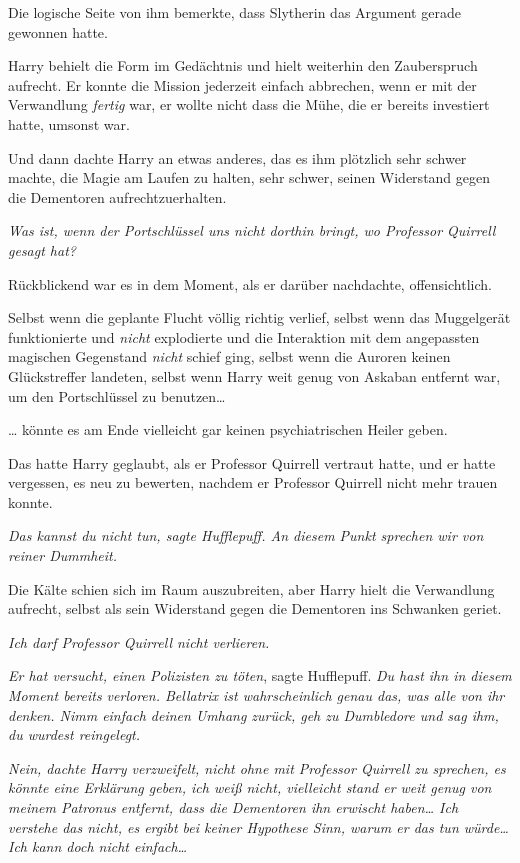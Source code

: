 {Die logische Seite von ihm bemerkte, dass Slytherin das Argument gerade gewonnen hatte.

Harry behielt die Form im Gedächtnis und hielt weiterhin den Zauberspruch aufrecht. Er konnte die Mission jederzeit einfach abbrechen, wenn er mit der Verwandlung \emph{fertig} war, er wollte nicht dass die Mühe, die er bereits investiert hatte, umsonst war.

Und dann dachte Harry an etwas anderes, das es ihm plötzlich sehr schwer machte, die Magie am Laufen zu halten, sehr schwer, seinen Widerstand gegen die Dementoren aufrechtzuerhalten.

\emph{Was ist, wenn der Portschlüssel uns nicht dorthin bringt, wo Professor Quirrell gesagt hat?}

Rückblickend war es in dem Moment, als er darüber nachdachte, offensichtlich.

Selbst wenn die geplante Flucht völlig richtig verlief, selbst wenn das Muggelgerät funktionierte und \emph{nicht} explodierte und die Interaktion mit dem angepassten magischen Gegenstand \emph{nicht} schief ging, selbst wenn die Auroren keinen Glückstreffer landeten, selbst wenn Harry weit genug von Askaban entfernt war, um den Portschlüssel zu benutzen…

… könnte es am Ende vielleicht gar keinen psychiatrischen Heiler geben.

Das hatte Harry geglaubt, als er Professor Quirrell vertraut hatte, und er hatte vergessen, es neu zu bewerten, nachdem er Professor Quirrell nicht mehr trauen konnte.

\emph{\emph{Das} \emph{kannst du} \emph{nicht tun,} sagte Hufflepuff\emph{. An diesem Punkt sprechen wir von reiner Dummheit.}}

Die Kälte schien sich im Raum auszubreiten, aber Harry hielt die Verwandlung aufrecht, selbst als sein Widerstand gegen die Dementoren ins Schwanken geriet.

\emph{Ich darf Professor Quirrell nicht verlieren.}

\emph{Er hat versucht, einen Polizisten zu töten}, sagte Hufflepuff. \emph{Du hast ihn in diesem Moment bereits verloren. Bellatrix ist wahrscheinlich genau das, was alle von ihr denken. Nimm einfach deinen Umhang zurück, geh zu Dumbledore und sag ihm, du wurdest reingelegt.}

\emph{\emph{Nein}, dachte Harry verzweifelt, \emph{nicht ohne mit Professor Quirrell zu sprechen, es könnte eine Erklärung geben, ich weiß nicht, vielleicht stand er weit genug von meinem Patronus entfernt, dass die Dementoren ihn erwischt haben… Ich verstehe das nicht, es ergibt bei} \emph{keiner} \emph{Hypothese} \emph{Sinn, warum er das tun würde… Ich kann doch nicht einfach…}}

}

